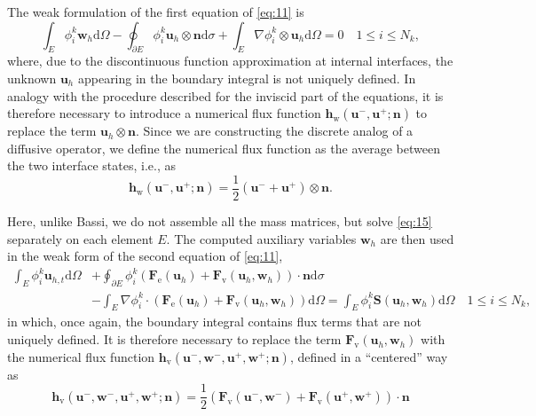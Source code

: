 \documentclass{develop-note}
\begin{document}
The weak formulation of the first equation of \autoref{eq:11} is
\begin{equation}
  \label{eq:15}
  \int_{E}\phi_{i}^{k}\mathbf{w}_{h}\mathrm{d}\Omega-\oint_{\partial E}\phi_{i}^{k}\mathbf{u}_{h}\otimes\mathbf{n}\mathrm{d}\sigma+\int_{E}\nabla\phi_{i}^{k}\otimes\mathbf{u}_{h}\mathrm{d}\Omega=0\quad 1\leqslant i\leqslant N_{k},
\end{equation}
where, due to the discontinuous function approximation at internal interfaces, the unknown $\mathbf{u}_{h}$ appearing in the boundary integral is not uniquely defined. In analogy with the procedure described for the inviscid part of the equations, it is therefore necessary to introduce a numerical flux function $\mathbf{h}_{\mathrm{w}}(\mathbf{u}^{-},\mathbf{u}^{+};\mathbf{n})$ to replace the term $\mathbf{u}_{h}\otimes\mathbf{n}$. Since we are constructing the discrete analog of a diffusive operator, we define the numerical flux function as the average between the two interface states, i.e., as
\begin{equation}
  \label{eq:16}
  \mathbf{h}_{\mathrm{w}}(\mathbf{u}^{-},\mathbf{u}^{+};\mathbf{n})=\dfrac{1}{2}(\mathbf{u}^{-}+\mathbf{u}^{+})\otimes\mathbf{n}.
\end{equation}

Here, unlike Bassi, we do not assemble all the mass matrices, but solve \autoref{eq:15} separately on each element $E$. The computed auxiliary variables $\mathbf{w}_{h}$ are then used in the weak form of the second equation of \autoref{eq:11},
\begin{equation}
  \label{eq:17}
  \begin{aligned}
    \int_{E}\phi_{i}^{k}\mathbf{u}_{h,t}\mathrm{d}\Omega &+\oint_{\partial E}\phi_{i}^{k}(\mathbf{F}_{\mathrm{e}}(\mathbf{u}_{h})+\mathbf{F}_{\mathrm{v}}(\mathbf{u}_{h},\mathbf{w}_{h}))\cdot\mathbf{n}\mathrm{d}\sigma\\
    &-\int_{E}\nabla\phi_{i}^{k}\cdot(\mathbf{F}_{\mathrm{e}}(\mathbf{u}_{h})+\mathbf{F}_{\mathrm{v}}(\mathbf{u}_{h},\mathbf{w}_{h}))\mathrm{d}\Omega=\int_{E}\phi_{i}^{k}\mathbf{S}(\mathbf{u}_{h},\mathbf{w}_{h})\mathrm{d}\Omega\quad 1\leqslant i\leqslant N_{k},
  \end{aligned}
\end{equation}
in which, once again, the boundary integral contains flux terms that are not uniquely defined. It is therefore necessary to replace the term $\mathbf{F}_{\mathrm{v}}(\mathbf{u}_{h},\mathbf{w}_{h})$ with the numerical flux function $\mathbf{h}_{\mathrm{v}}(\mathbf{u}^{-},\mathbf{w}^{-},\mathbf{u}^{+},\mathbf{w}^{+};\mathbf{n})$, defined in a ``centered'' way as
\begin{equation}
  \mathbf{h}_{\mathrm{v}}(\mathbf{u}^{-},\mathbf{w}^{-},\mathbf{u}^{+},\mathbf{w}^{+};\mathbf{n})=\dfrac{1}{2}(\mathbf{F}_{\mathrm{v}}(\mathbf{u}^{-},\mathbf{w}^{-})+\mathbf{F}_{\mathrm{v}}(\mathbf{u}^{+},\mathbf{w}^{+}))\cdot\mathbf{n}
\end{equation}
\end{document}
